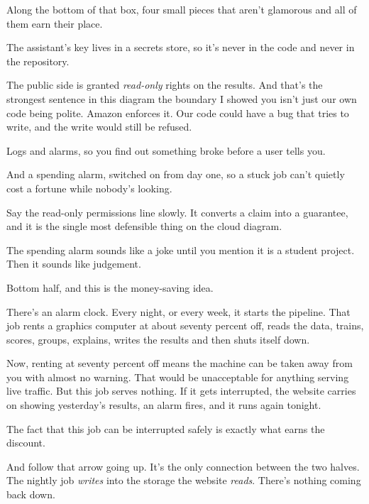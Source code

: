 \documentclass[11pt]{article}
\begin{document}

\begin{saythis}
Along the bottom of that box, four small pieces that aren't glamorous and all
of them earn their place.

The assistant's key lives in a secrets store, so it's never in the code and
never in the repository.

The public side is granted \emph{read-only} rights on the results. And that's
the strongest sentence in this diagram \bt the boundary I showed you isn't just
our own code being polite. Amazon enforces it. Our code could have a bug that
tries to write, and the write would still be refused.

Logs and alarms, so you find out something broke before a user tells you.

And a spending alarm, switched on from day one, so a stuck job can't quietly
cost a fortune while nobody's looking.
\end{saythis}

\begin{means}
Say the read-only permissions line slowly. It converts a claim into a
guarantee, and it is the single most defensible thing on the cloud diagram.

The spending alarm sounds like a joke until you mention it is a student
project. Then it sounds like judgement.
\end{means}


\begin{saythis}
Bottom half, and this is the money-saving idea.

There's an alarm clock. Every night, or every week, it starts the pipeline.
That job rents a graphics computer at about seventy percent off, reads the
data, trains, scores, groups, explains, writes the results \bt and then shuts
itself down.

Now, renting at seventy percent off means the machine can be taken away from
you with almost no warning. That would be unacceptable for anything serving
live traffic. But this job serves nothing. If it gets interrupted, the website
carries on showing yesterday's results, an alarm fires, and it runs again
tonight.

The fact that this job can be interrupted safely is exactly what earns the
discount.

And follow that arrow going up. It's the only connection between the two
halves. The nightly job \emph{writes} into the storage the website
\emph{reads}. There's nothing coming back down.
\end{saythis}
\end{document}
